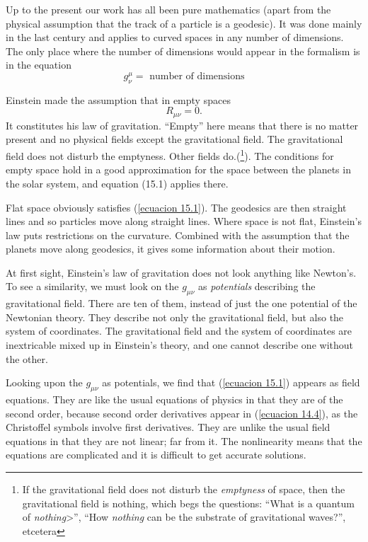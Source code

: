 Up to the present our work has all been pure mathematics (apart from the physical assumption that the track of a 
particle is a geodesic). It was done mainly in the last century and applies to curved spaces in any number of 
dimensions. The only place where the number of dimensions would appear in the formalism is in the equation 
\[g^{\mu}_{\nu} = \mbox{ number of dimensions}\]

    Einstein made the assumption that in empty spaces
\begin{equation}
    \label{ecuacion 15.1}
    R_{\mu\nu} = 0.
\end{equation}
It constitutes his law of gravitation. ``Empty'' here means that there is no matter present and no physical fields 
except the gravitational field. The gravitational field does not disturb the emptyness. Other fields do.(\footnote{If 
the gravitational field does not disturb the \emph{emptyness} of space, then the gravitational field is nothing, which 
begs the questions: ``What is a quantum of \emph{nothing}>'', ``How \emph{nothing} can be the substrate of 
gravitational waves?'', etcetera}). The conditions for empty space hold in a good approximation for the space between 
the planets in the solar system, and equation (15.1) applies there. 

Flat space obviously satisfies (\ref{ecuacion 15.1}). The geodesics are then straight lines and so particles move along 
straight lines. Where space is not flat, Einstein's law puts restrictions on the curvature. Combined with the 
assumption that the planets move along geodesics, it gives some information about their motion.

At first sight, Einstein's law of gravitation does not look anything like Newton's. To see a similarity, we must look 
on the $g_{\mu\nu}$ as \emph{potentials} describing the gravitational field. There are ten of them, instead of just the 
one potential of the Newtonian theory. They describe not only the gravitational field, but also the system of 
coordinates. The gravitational field and the system of coordinates are inextricable mixed up in Einstein's theory, and 
one cannot describe one without the other.

Looking upon the $g_{\mu\nu}$ as potentials, we find that (\ref{ecuacion 15.1}) appears as field equations. They are 
like the usual equations of physics in that they are of the second order, because second order derivatives appear in 
(\ref{ecuacion 14.4}), as the Christoffel symbols involve first derivatives. They are unlike the usual field equations 
in that they are not linear; far from it. The nonlinearity means that the equations are complicated and it is difficult 
to get accurate solutions.




